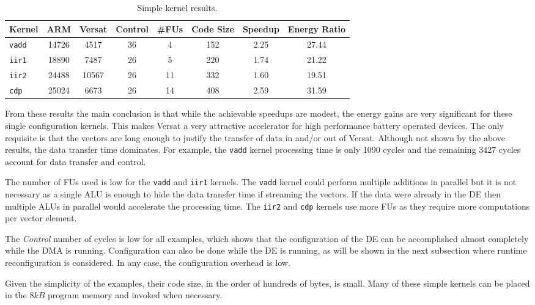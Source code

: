 \begin{table}[!htb]
  \renewcommand{\arraystretch}{1.2} %
  \caption{Simple kernel results.}
  \label{tabExecR}
  \centering
  \begin{tabular}{lccccccc}
    \toprule
    Kernel & ARM & Versat & Control & \#FUs & Code Size & Speedup & Energy Ratio\\
    \midrule
    {\tt vadd} & 14726 &  4517 & 36 &  4 & 152 & 2.25 & 27.44\\
    {\tt iir1} & 18890 &  7487 & 26 &  5 & 220 & 1.74 & 21.22\\
    {\tt iir2} & 24488 & 10567 & 26 & 11 & 332 & 1.60 & 19.51\\
    {\tt cdp}  & 25024 &  6673 & 26 & 14 & 408 & 2.59 & 31.59\\
    \bottomrule
  \end{tabular}
\end{table}

From these results the main conclusion is that while the achievable
speedups are modest, the energy gains are very significant for these
single configuration kernels. This makes Versat a very attractive
accelerator for high performance battery operated devices. The only
requisite is that the vectors are long enough to justify the transfer
of data in and/or out of Versat. Although not shown by the above
results, the data transfer time dominates. For example, the {\tt vadd}
kernel processing time is only 1090 cycles and the remaining 3427
cycles account for data transfer and control.

The number of FUs used is low for the {\tt vadd} and {\tt iir1}
kernels. The {\tt vadd} kernel could perform multiple additions in
parallel but it is not necessary as a single ALU is enough to hide the
data transfer time if streaming the vectors. If the data were already
in the DE then multiple ALUs in parallel would accelerate the
processing time. The {\tt iir2} and {\tt cdp} kernels use more FUs
as they require more computations per vector element.

The {\em Control} number of cycles is low for all examples, which
shows that the configuration of the DE can be accomplished almost
completely while the DMA is running. Configuration can also be done
while the DE is running, as will be shown in the next subsection where
runtime reconfiguration is considered. In any case, the configuration
overhead is low.

Given the simplicity of the examples, their code size, in the order of
hundreds of bytes, is small. Many of these simple kernels can be
placed in the $8kB$ program memory and invoked when necessary.


